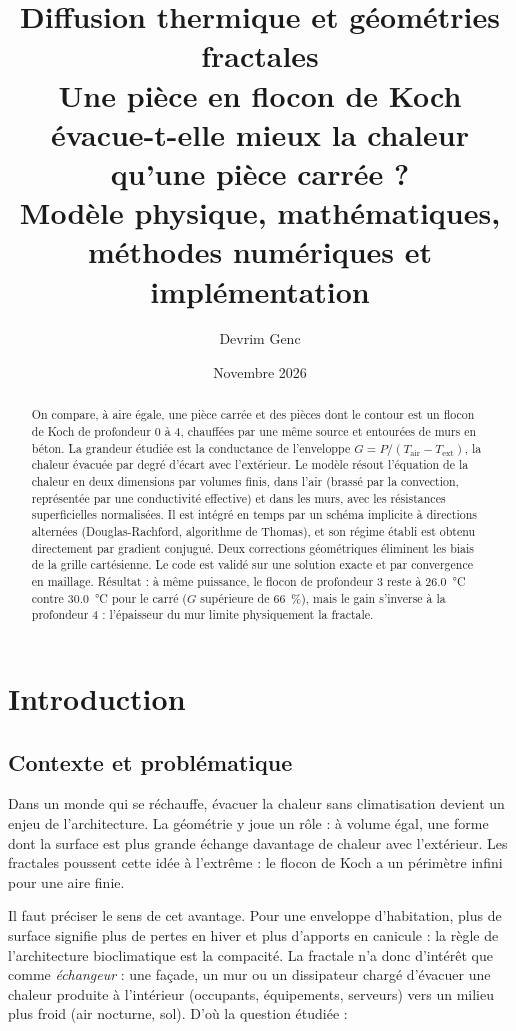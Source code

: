 \documentclass[11pt,a4paper]{article}
\title{\textbf{Diffusion thermique et géométries fractales}\\[0.4em]
\large Une pièce en flocon de Koch évacue-t-elle mieux la chaleur qu'une pièce carrée ?\\
Modèle physique, mathématiques, méthodes numériques et implémentation}
\author{Devrim Genc}
\date{Novembre 2026}
\theoremstyle{definition}
\theoremstyle{remark}
\newcommand{\Text}{T_{\mathrm{ext}}}
\newcommand{\Tair}{T_{\mathrm{air}}}
\begin{document}
\maketitle

\begin{abstract}
On compare, à aire égale, une pièce carrée et des pièces dont le contour est un
flocon de Koch de profondeur 0 à 4, chauffées par une même source et entourées de
murs en béton. La grandeur étudiée est la conductance de l'enveloppe
$G = P/(\Tair-\Text)$, la chaleur évacuée par degré d'écart avec l'extérieur. Le
modèle résout l'équation de la chaleur en deux dimensions par volumes finis, dans
l'air (brassé par la convection, représentée par une conductivité effective) et
dans les murs, avec les résistances superficielles normalisées. Il est intégré en
temps par un schéma implicite à directions alternées (Douglas-Rachford, algorithme
de Thomas), et son régime établi est obtenu directement par gradient conjugué.
Deux corrections géométriques éliminent les biais de la grille cartésienne. Le code
est validé sur une solution exacte et par convergence en maillage. Résultat : à
même puissance, le flocon de profondeur 3 reste à \qty{26,0}{\degreeCelsius} contre
\qty{30,0}{\degreeCelsius} pour le carré ($G$ supérieure de \qty{66}{\percent}),
mais le gain s'inverse à la profondeur 4 : l'épaisseur du mur limite physiquement
la fractale.
\end{abstract}

\tableofcontents
\newpage

\section{Introduction}

\subsection{Contexte et problématique}

Dans un monde qui se réchauffe, évacuer la chaleur sans climatisation devient un
enjeu de l'architecture. La géométrie y joue un rôle : à volume égal, une forme dont
la surface est plus grande échange davantage de chaleur avec l'extérieur. Les
fractales poussent cette idée à l'extrême : le flocon de Koch a un périmètre infini
pour une aire finie.

Il faut préciser le sens de cet avantage. Pour une enveloppe d'habitation, plus de
surface signifie plus de pertes en hiver et plus d'apports en canicule : la règle de
l'architecture bioclimatique est la compacité. La fractale n'a donc d'intérêt que
comme \emph{échangeur} : une façade, un mur ou un dissipateur chargé d'évacuer une
chaleur produite à l'intérieur (occupants, équipements, serveurs) vers un milieu plus
froid (air nocturne, sol). D'où la question étudiée :
\end{document}
